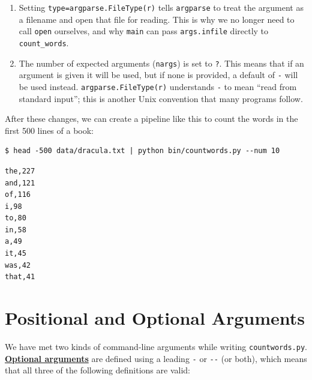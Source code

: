 \documentclass[
]{krantz}
\newcommand{\gref}[2]{\hyperlink{#2}{\textbf{#1}}}
\begin{document}
\begin{enumerate}
\def\labelenumi{\arabic{enumi}.}
\item
  Setting \texttt{type=argparse.FileType(\textquotesingle{}r\textquotesingle{})}
  tells \texttt{argparse} to treat the argument as a filename
  and open that file for reading.
  This is why we no longer need to call \texttt{open} ourselves,
  and why \texttt{main} can pass \texttt{args.infile} directly to \texttt{count\_words}.
\item
  The number of expected arguments (\texttt{nargs}) is set to \texttt{?}.
  This means that if an argument is given it will be used,
  but if none is provided,
  a default of \texttt{\textquotesingle{}-\textquotesingle{}} will be used instead.
  \texttt{argparse.FileType(\textquotesingle{}r\textquotesingle{})} understands \texttt{\textquotesingle{}-\textquotesingle{}} to mean ``read from standard input'';
  this is another Unix convention that many programs follow.
\end{enumerate}

After these changes,
we can create a pipeline like this
to count the words in the first 500 lines of a book:

\begin{verbatim}
$ head -500 data/dracula.txt | python bin/countwords.py --num 10
\end{verbatim}

\begin{verbatim}
the,227
and,121
of,116
i,98
to,80
in,58
a,49
it,45
was,42
that,41
\end{verbatim}

\hypertarget{py-rse-py-scripting-positional-optional}{%
\section{Positional and Optional Arguments}\label{py-rse-py-scripting-positional-optional}}

We have met two kinds of command-line arguments while writing \texttt{countwords.py}.
\gref{Optional arguments}{optional\_argument}
are defined using a leading \texttt{-} or \texttt{-\/-} (or both),
which means that all three of the following definitions are valid:
\end{document}
